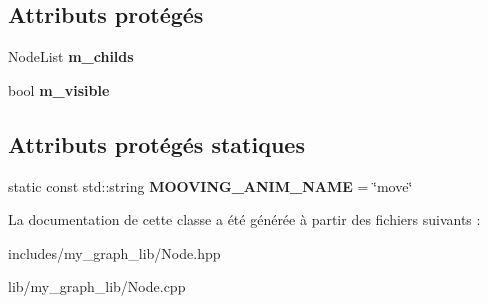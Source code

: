 \subsection*{Attributs protégés}
\begin{DoxyCompactItemize}
\item 
\mbox{\label{classmy_1_1Node_a4b1e064d05cefffda0ce6bae3193f4d0}} 
Node\+List {\bfseries m\+\_\+childs}
\item 
\mbox{\label{classmy_1_1Node_a1d55e20d5b5ab37c5e8b3c0b84af011f}} 
bool {\bfseries m\+\_\+visible}
\end{DoxyCompactItemize}
\subsection*{Attributs protégés statiques}
\begin{DoxyCompactItemize}
\item 
\mbox{\label{classmy_1_1Node_a80d18cd003826c77e7c2ef769dd7dc3a}} 
static const std\+::string {\bfseries M\+O\+O\+V\+I\+N\+G\+\_\+\+A\+N\+I\+M\+\_\+\+N\+A\+ME} = \char`\"{}move\char`\"{}
\end{DoxyCompactItemize}


La documentation de cette classe a été générée à partir des fichiers suivants \+:\begin{DoxyCompactItemize}
\item 
includes/my\+\_\+graph\+\_\+lib/Node.\+hpp\item 
lib/my\+\_\+graph\+\_\+lib/Node.\+cpp\end{DoxyCompactItemize}
